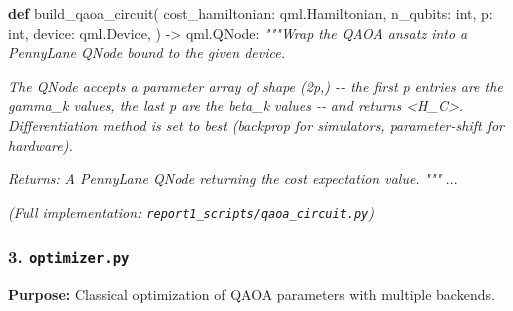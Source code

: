 \documentclass[
  11pt,
]{report}
\newenvironment{Shaded}{}{}
\newcommand{\BuiltInTok}[1]{\textcolor[rgb]{0.00,0.50,0.00}{#1}}
\newcommand{\CommentTok}[1]{\textcolor[rgb]{0.38,0.63,0.69}{\textit{#1}}}
\newcommand{\KeywordTok}[1]{\textcolor[rgb]{0.00,0.44,0.13}{\textbf{#1}}}
\newcommand{\NormalTok}[1]{#1}
\newcommand{\OperatorTok}[1]{\textcolor[rgb]{0.40,0.40,0.40}{#1}}
\begin{document}
\begin{Shaded}
\begin{Highlighting}[]
\KeywordTok{def}\NormalTok{ build\_qaoa\_circuit(}
\NormalTok{    cost\_hamiltonian: qml.Hamiltonian,}
\NormalTok{    n\_qubits: }\BuiltInTok{int}\NormalTok{,}
\NormalTok{    p: }\BuiltInTok{int}\NormalTok{,}
\NormalTok{    device: qml.Device,}
\NormalTok{) }\OperatorTok{{-}\textgreater{}}\NormalTok{ qml.QNode:}
    \CommentTok{"""Wrap the QAOA ansatz into a PennyLane QNode bound to the given device.}

\CommentTok{    The QNode accepts a parameter array of shape (2p,) {-}{-} the first p}
\CommentTok{    entries are the gamma\_k values, the last p are the beta\_k values {-}{-}}
\CommentTok{    and returns \textless{}H\_C\textgreater{}. Differentiation method is set to \textquotesingle{}best\textquotesingle{}}
\CommentTok{    (backprop for simulators, parameter{-}shift for hardware).}

\CommentTok{    Returns:}
\CommentTok{        A PennyLane QNode returning the cost expectation value.}
\CommentTok{    """}
\NormalTok{    ...}
\end{Highlighting}
\end{Shaded}

\emph{(Full implementation: \texttt{report1\_scripts/qaoa\_circuit.py})}

\subsubsection{\texorpdfstring{3.
\texttt{optimizer.py}}{3. optimizer.py}}\label{optimizer.py}

\textbf{Purpose:} Classical optimization of QAOA parameters with
multiple backends.
\end{document}
